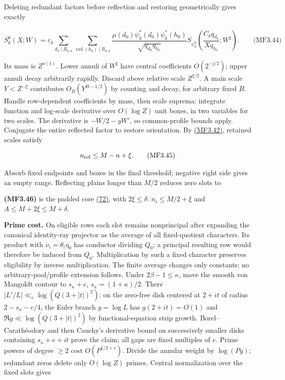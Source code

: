 Deleting redundant factors before reflection and restoring geometrically gives exactly

\hypertarget{mf:eq:B3.44}{}

\label{mf:eq:B3.44}

\[
S_k^0(X;W)=\varepsilon_k
 \sum_{d_0\mid R_{0,k}}\sum_{\operatorname{rad}(h_0)\mid R_{0,k}}
 \frac{\mu(d_0)\psi_k^*(d_0)\overline{\psi_k^*(h_0)}}{\sqrt{q_{d_0}q_{h_0}}}
 S_{\overline{\psi_k^0}}\!\left(\frac{C_kq_{d_0}}{Xq_{h_0}};W^\sharp\right).
\qquad\text{(MF3.44)}
\]

Its mass is \(Z^{o(1)}\). Lower annuli of \(W^\sharp\) have central coefficients \(O(2^{-j/2})\); upper annuli decay arbitrarily rapidly. Discard above relative scale \(Z^{\xi/2}\). A main scale \(Y<Z^{-\xi}\) contributes \(O_B(Y^{B-1/2})\) by counting and decay, for arbitrary fixed \(B\). Handle row-dependent coefficients by mass, then scale suprema: integrate function and log-scale derivative over \(O(\log Z)\) unit boxes, in two variables for two scales. The derivative is \(-W/2-yW'\), so common-profile bounds apply. Conjugate the entire reflected factor to restore orientation. By \protect\hyperlink{mf:eq:B3.42}{(MF3.42)}, retained scales satisfy

\hypertarget{mf:eq:B3.45}{}

\label{mf:eq:B3.45}

\[
n_{\rm ref}\le M-n+\xi.
\qquad\text{(MF3.45)}
\]

Absorb fixed endpoints and boxes in the final threshold; negative right side gives an empty range. Reflecting plains longer than \(M/2\) reduces zero slots to

\hypertarget{mf:eq:B3.46}{}

\label{mf:eq:B3.46}

\textbf{(MF3.46)} is the padded core \protect\hyperlink{cf:eq:D.8}{(72)}, with \(2\xi\le\delta\): \(n_i\le M/2+\xi\) and \(A\le M+2\xi\le M+\delta\).

\textbf{Prime cost.} On eligible rows each slot remains nonprincipal after expanding the canonical identity-ray projector as the average of all fixed-quotient characters. Its product with \(\nu_i=\theta_i\overline{\eta_0}\) has conductor dividing \(Q_0\); a principal resulting row would therefore be induced from \(Q_0\). Multiplication by such a fixed character preserves eligibility by inverse multiplication. The finite average changes only constants; no arbitrary-pool/profile extension follows. Under \(2\beta-1\le\kappa\), move the smooth von Mangoldt contour to \(s_\kappa+e\), \(s_\kappa=(1+\kappa)/2\). There \(|L'/L|\ll_e\log(Q(3+|t|)^2)\): on the zero-free disk centered at \(2+it\) of radius \(2-s_\kappa-e/4\), the Euler branch \(g=\log L\) has \(g(2+it)=O(1)\) and \(\Re g\ll\log(Q(3+|t|)^2)\) by functional-equation strip growth. Borel--Carathéodory and then Cauchy's derivative bound on successively smaller disks containing \(s_\kappa+e+it\) prove the claim; all gaps are fixed multiples of \(e\). Prime powers of degree \(\ge2\) cost \(O(P^{1/2+\epsilon})\). Divide the annular weight by \(\log(Py)\); redundant zeros delete only \(O(\log Z)\) primes. Central normalization over the fixed slots gives

